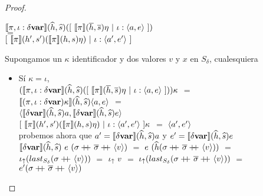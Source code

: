 \begin{proof}
\begin{itemize}
\begin{itemize}
\begin{center}
$\semBrcks{\pi,\iota:\deltavar}(\hhat,\shat)
([ \ \semBrcks{\pi}(\hover,\sover)\eta \ | \ \iota:\lrangles{a,e} \ ])$\\ 
$=$\\
$[ \ \semBrcks{\pi}(h',s')(\semBrcks{\pi}(h,s)\eta) \ | \ \iota:\lrangles{a',e'} \ ]$
\end{center}

Supongamos un $\kappa$ identificador y dos valores $v$ y $x$ en $S_\delta$, cualesquiera

\begin{itemize}
\item S\'i $\kappa = \iota$, \\

$(\semBrcks{\pi,\iota:\deltavar}(\hhat,\shat)
([ \ \semBrcks{\pi}(\hover,\sover)\eta \ | \ \iota:\lrangles{a,e} \ ]))\kappa$ $=$\\
$\llbracket (\pi,\iota:\delta \textbf{var}) \kappa \rrbracket(\widehat{h},\widehat{s})\langle a,e \rangle$ $=$\\
$\langle \llbracket \delta \textbf{var} \rrbracket(\widehat{h},\widehat{s})a,\llbracket \delta \textbf{var} \rrbracket(\widehat{h},\widehat{s})e \rangle$\\

$[ \ \semBrcks{\pi}(h',s')(\semBrcks{\pi}(h,s)\eta) \ | \ \iota:\lrangles{a',e'} \ ] \kappa$ $=$
$\langle a',e' \rangle$\\

probemos ahora que $a' = \llbracket \delta \textbf{var} \rrbracket(\widehat{h},\widehat{s})a$ y 
$e' = \llbracket \delta \textbf{var} \rrbracket(\widehat{h},\widehat{s})e$\\

$\semBrcks{\deltavar}(\hhat,\shat) \ e \ (\sigma \concat \sigmaover \concat \lrangles{v})$ $=$
$e \ (\widehat{h} (\sigma +\kern-1.3ex+\kern0.8ex \overline{\sigma} +\kern-1.3ex+\kern0.8ex \langle v \rangle))$ $=$\\
$\iota_{\uparrow} (last_{S_\delta} (\sigma +\kern-1.3ex+\kern0.8ex \langle v \rangle))$ $=$ $\iota_{\uparrow} \ v$ $=$
$\iota_{\uparrow} (last_{S_\delta} (\sigma +\kern-1.3ex+\kern0.8ex \overline{\sigma} +\kern-1.3ex+\kern0.8ex \langle v \rangle))$ $=$ \\
$e' (\sigma +\kern-1.3ex+\kern0.8ex \overline{\sigma} +\kern-1.3ex+\kern0.8ex \langle v \rangle)$\\


\end{itemize}
\end{itemize}
\end{itemize}
\end{proof}
